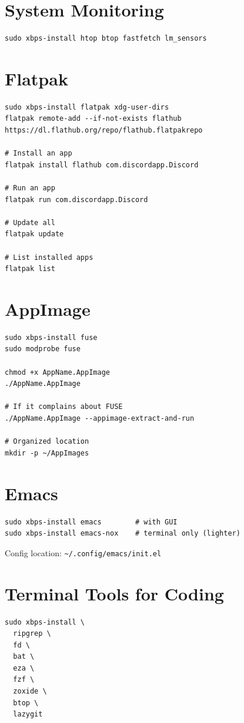 \documentclass[12pt, a4paper]{book}
\begin{document}
\section{System Monitoring}
\begin{lstlisting}
sudo xbps-install htop btop fastfetch lm_sensors
\end{lstlisting}

\section{Flatpak}
\begin{lstlisting}
sudo xbps-install flatpak xdg-user-dirs
flatpak remote-add --if-not-exists flathub https://dl.flathub.org/repo/flathub.flatpakrepo

# Install an app
flatpak install flathub com.discordapp.Discord

# Run an app
flatpak run com.discordapp.Discord

# Update all
flatpak update

# List installed apps
flatpak list
\end{lstlisting}

\section{AppImage}
\begin{lstlisting}
sudo xbps-install fuse
sudo modprobe fuse

chmod +x AppName.AppImage
./AppName.AppImage

# If it complains about FUSE
./AppName.AppImage --appimage-extract-and-run

# Organized location
mkdir -p ~/AppImages
\end{lstlisting}

\section{Emacs}
\begin{lstlisting}
sudo xbps-install emacs        # with GUI
sudo xbps-install emacs-nox    # terminal only (lighter)
\end{lstlisting}
Config location: \texttt{\textasciitilde/.config/emacs/init.el}

\section{Terminal Tools for Coding}
\begin{lstlisting}
sudo xbps-install \
  ripgrep \
  fd \
  bat \
  eza \
  fzf \
  zoxide \
  btop \
  lazygit
\end{lstlisting}
\end{document}
